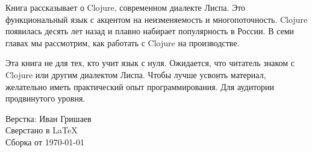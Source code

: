 \thispagestyle{empty}

\small

Книга рассказывает о Clojure, современном диалекте Лиспа. Это функциональный
язык с акцентом на неизменяемость и многопоточность. Clojure появилась десять
лет назад и плавно набирает популярность в России. В семи главах мы рассмотрим,
как работать с Clojure на производстве.

Эта книга не для тех, кто учит язык с нуля. Ожидается, что читатель знаком с
Clojure или другим диалектом Лиспа. Чтобы лучше усвоить материал, желательно
иметь практический опыт программирования. Для аудитории продвинутого уровня.

\normalfont

\vspace{5em}

\noindent
Верстка: Иван Гришаев\\
Сверстано в \LaTeX\\
Сборка от \today
